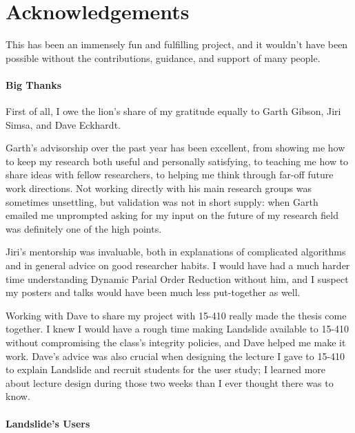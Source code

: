 \chapter*{Acknowledgements}

This has been an immensely fun and fulfilling project, and it wouldn't have been possible without the contributions, guidance, and support of many people.

\subsubsection{Big Thanks}

First of all, I owe the lion's share of my gratitude equally to Garth Gibson, Jiri Simsa, and Dave Eckhardt.

Garth's advisorship over the past year has been excellent, from showing me how to keep my research both useful and personally satisfying, to teaching me how to share ideas with fellow researchers, to helping me think through far-off future work directions. Not working directly with his main research groups was sometimes unsettling, but validation was not in short supply: when Garth emailed me unprompted asking for my input on the future of my research field was definitely one of the high points.

Jiri's mentorship was invaluable, both in explanations of complicated algorithms and in general advice on good researcher habits. I would have had a much harder time understanding Dynamic Parial Order Reduction without him, and I suspect my posters and talks would have been much less put-together as well.

Working with Dave to share my project with 15-410 really made the thesis come together. I knew I would have a rough time making Landslide available to 15-410 without compromising the class's integrity policies, and Dave helped me make it work. Dave's advice was also crucial when designing the lecture I gave to 15-410 to explain Landslide and recruit students for the user study; I learned more about lecture design during those two weeks than I ever thought there was to know.

\subsubsection{Landslide's Users}

